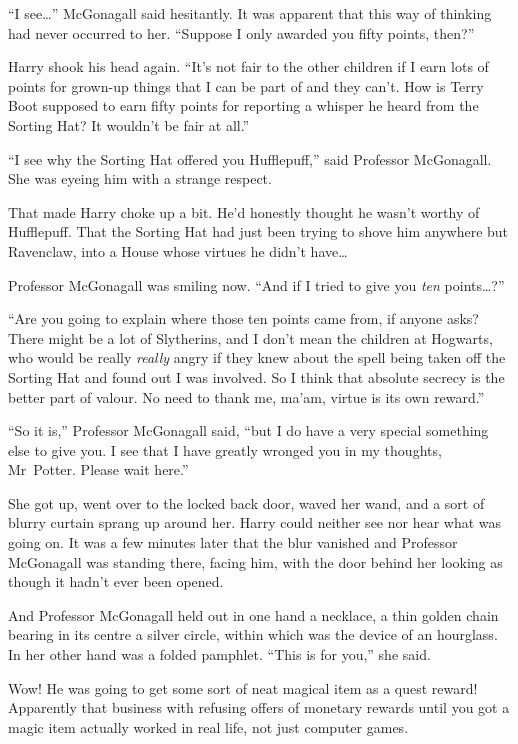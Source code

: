“I see…” McGonagall said hesitantly. It was apparent that this way of thinking had never occurred to her. “Suppose I only awarded you fifty points, then?”

Harry shook his head again. “It’s not fair to the other children if I earn lots of points for grown-up things that I can be part of and they can’t. How is Terry Boot supposed to earn fifty points for reporting a whisper he heard from the Sorting Hat? It wouldn’t be fair at all.”

“I see why the Sorting Hat offered you Hufflepuff,” said Professor McGonagall. She was eyeing him with a strange respect.

That made Harry choke up a bit. He’d honestly thought he wasn’t worthy of Hufflepuff. That the Sorting Hat had just been trying to shove him anywhere but Ravenclaw, into a House whose virtues he didn’t have…

Professor McGonagall was smiling now. “And if I tried to give you \emph{ten} points…?”

“Are you going to explain where those ten points came from, if anyone asks? There might be a lot of Slytherins, and I don’t mean the children at Hogwarts, who would be really \emph{really} angry if they knew about the spell being taken off the Sorting Hat and found out I was involved. So I think that absolute secrecy is the better part of valour. No need to thank me, ma’am, virtue is its own reward.”

“So it is,” Professor McGonagall said, “but I do have a very special something else to give you. I see that I have greatly wronged you in my thoughts, Mr~Potter. Please wait here.”

She got up, went over to the locked back door, waved her wand, and a sort of blurry curtain sprang up around her. Harry could neither see nor hear what was going on. It was a few minutes later that the blur vanished and Professor McGonagall was standing there, facing him, with the door behind her looking as though it hadn’t ever been opened.

And Professor McGonagall held out in one hand a necklace, a thin golden chain bearing in its centre a silver circle, within which was the device of an hourglass. In her other hand was a folded pamphlet. “This is for you,” she said.

Wow! He was going to get some sort of neat magical item as a quest reward! Apparently that business with refusing offers of monetary rewards until you got a magic item actually worked in real life, not just computer games.

